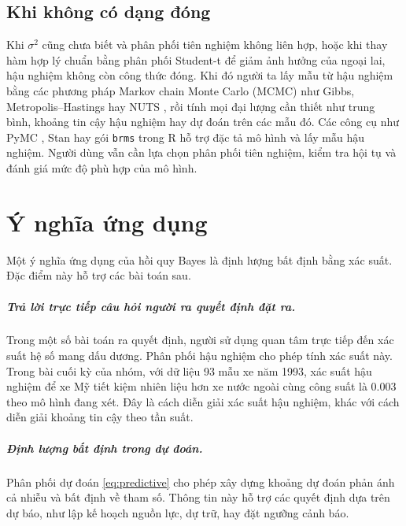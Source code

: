 \documentclass[12pt,a4paper]{report}
\begin{document}
\section{Khi không có dạng đóng}

Khi $\sigma^2$ cũng chưa biết và phân phối tiên nghiệm không liên hợp, hoặc khi thay hàm hợp lý
chuẩn bằng phân phối Student-t để giảm ảnh hưởng của ngoại lai, hậu nghiệm không còn công
thức đóng. Khi đó người ta lấy mẫu từ hậu nghiệm bằng các phương pháp Markov chain
Monte Carlo (MCMC) như Gibbs, Metropolis--Hastings hay NUTS \cite{hoffman2014nuts},
rồi tính mọi đại lượng cần thiết như trung bình, khoảng tin cậy hậu nghiệm hay dự đoán
trên các mẫu đó. Các công cụ như PyMC \cite{abrilpla2023pymc}, Stan hay gói
\texttt{brms} trong R \cite{rbloggers2026blr} hỗ trợ đặc tả mô hình và lấy mẫu hậu nghiệm. Người dùng vẫn cần lựa chọn
phân phối tiên nghiệm, kiểm tra hội tụ và đánh giá mức độ phù hợp của mô hình.

\chapter{Ý nghĩa ứng dụng}
\label{sec:meaning}

Một ý nghĩa ứng dụng của hồi quy Bayes là định lượng bất định bằng xác suất.
Đặc điểm này hỗ trợ các bài toán sau.

\paragraph{Trả lời trực tiếp câu hỏi người ra quyết định đặt ra.} Trong một số bài toán ra quyết định, người sử dụng quan tâm trực tiếp đến
xác suất hệ số mang dấu dương. Phân phối hậu nghiệm cho phép tính xác suất này. Trong bài cuối kỳ của nhóm, với dữ liệu 93
mẫu xe năm 1993, xác suất hậu nghiệm để xe Mỹ tiết kiệm nhiên liệu hơn xe nước
ngoài cùng công suất là \num{0.003} theo mô hình đang xét. Đây là cách diễn giải xác suất
hậu nghiệm, khác với cách diễn giải khoảng tin cậy theo tần suất.

\paragraph{Định lượng bất định trong dự đoán.} Phân phối dự đoán
\eqref{eq:predictive} cho phép xây dựng khoảng dự đoán phản ánh cả nhiễu và bất định về
tham số. Thông tin này hỗ trợ các quyết định dựa trên dự báo,
như lập kế hoạch nguồn lực, dự trữ, hay đặt ngưỡng cảnh báo.
\end{document}
